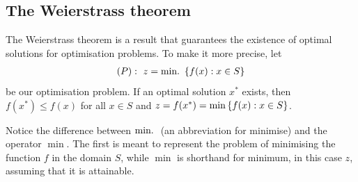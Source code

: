 

\subsection{The Weierstrass theorem}


The Weierstrass theorem is a result that guarantees the existence of optimal solutions for optimisation problems. To make it more precise, let
%
\begin{align*}
	(P) :~ z = \mathop{\text{min.~}}\left\{ f(x) : x \in S \right \}  
\end{align*}
%
be our optimisation problem. If an optimal solution $x^*$ exists, then $f(x^*) \leq f(x)$ for all $x \in S$ and $z = f(x^*) = \min \left\{ f(x) : x \in S \right \}$. 

Notice the difference between $\mathop{\text{min.~}}$ (an abbreviation for minimise) and the operator $\min$. The first is meant to represent the problem of minimising the function $f$ in the domain $S$, while $\min$ is shorthand for minimum, in this case $z$, assuming that it is attainable.

